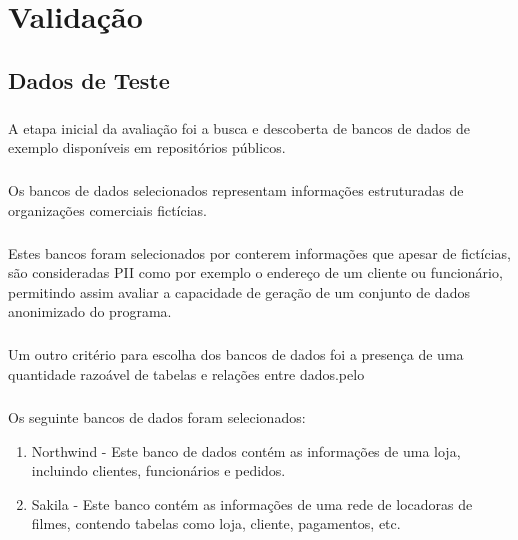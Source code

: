 \chapter{Validação}
\label{cap5}

\section{Dados de Teste}


\paragraph{} A etapa inicial da avaliação foi a busca e descoberta de bancos de dados de exemplo disponíveis em repositórios públicos.

\paragraph{} Os bancos de dados selecionados representam informações estruturadas de organizações comerciais fictícias.

\paragraph{} Estes bancos foram selecionados por conterem informações que apesar de fictícias, são consideradas PII como por exemplo o endereço de um cliente ou funcionário, permitindo assim avaliar a capacidade de geração de um conjunto de dados anonimizado do programa.

\paragraph{} Um outro critério para escolha dos bancos de dados foi a presença de uma quantidade razoável de tabelas e relações entre dados.pelo

\paragraph{} Os seguinte bancos de dados foram selecionados:

\begin{enumerate}
    \item Northwind\cite{northwindpg} - Este banco de dados contém as informações de uma loja, incluindo clientes, funcionários e pedidos.
    \item Sakila\cite{sakila} - Este banco contém as informações de uma rede de locadoras de filmes, contendo tabelas como loja, cliente, pagamentos, etc.
\end{enumerate}


